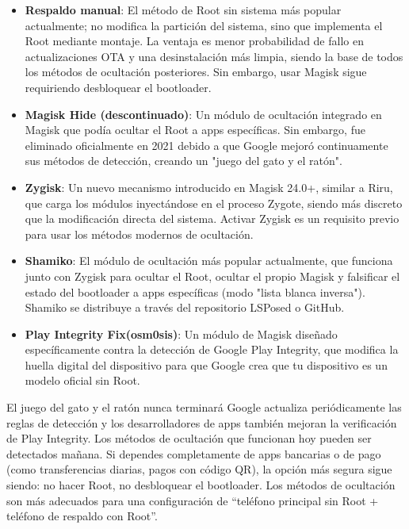 \begin{itemize}
  \item \textbf{Respaldo manual}: El método de Root sin sistema más popular actualmente; no modifica la partición del sistema, sino que implementa el Root mediante montaje. La ventaja es menor probabilidad de fallo en actualizaciones OTA y una desinstalación más limpia, siendo la base de todos los métodos de ocultación posteriores. Sin embargo, usar Magisk sigue requiriendo desbloquear el bootloader.
  \item \textbf{Magisk Hide (descontinuado)}: Un módulo de ocultación integrado en Magisk que podía ocultar el Root a apps específicas. Sin embargo, fue eliminado oficialmente en 2021 debido a que Google mejoró continuamente sus métodos de detección, creando un "juego del gato y el ratón".
  \item \textbf{Zygisk}: Un nuevo mecanismo introducido en Magisk 24.0+, similar a Riru, que carga los módulos inyectándose en el proceso Zygote, siendo más discreto que la modificación directa del sistema. Activar Zygisk es un requisito previo para usar los métodos modernos de ocultación.
  \item \textbf{Shamiko}: El módulo de ocultación más popular actualmente, que funciona junto con Zygisk para ocultar el Root, ocultar el propio Magisk y falsificar el estado del bootloader a apps específicas (modo "lista blanca inversa"). Shamiko se distribuye a través del repositorio LSPosed o GitHub.
  \item \textbf{Play Integrity Fix(osm0sis)}: Un módulo de Magisk diseñado específicamente contra la detección de Google Play Integrity, que modifica la huella digital del dispositivo para que Google crea que tu dispositivo es un modelo oficial sin Root.
\end{itemize}

\begin{tcbwarn}{El juego del gato y el ratón nunca terminará}
Google actualiza periódicamente las reglas de detección y los desarrolladores de apps también mejoran la verificación de Play Integrity. Los métodos de ocultación que funcionan hoy pueden ser detectados mañana. Si dependes completamente de apps bancarias o de pago (como transferencias diarias, pagos con código QR), la opción más segura sigue siendo: no hacer Root, no desbloquear el bootloader. Los métodos de ocultación son más adecuados para una configuración de “teléfono principal sin Root + teléfono de respaldo con Root”.

\end{tcbwarn}


